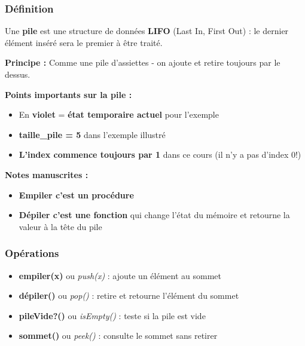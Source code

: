 \documentclass[12pt,a4paper]{article}
\begin{document}
\subsubsection{Définition}

\begin{definition}
Une \textbf{pile} est une structure de données \textcolor{importantrouge}{\textbf{LIFO}} (Last In, First Out) : le dernier élément inséré sera le premier à être traité.

\textbf{Principe :} Comme une pile d'assiettes - on ajoute et retire toujours par le dessus.
\end{definition}

\begin{notecours}
\textbf{Points importants sur la pile :}
\begin{itemize}
    \item En \textbf{violet} = \textbf{état temporaire actuel} pour l'exemple
    \item \textbf{taille\_pile = 5} dans l'exemple illustré
    \item \textbf{L'index commence toujours par 1} dans ce cours (il n'y a pas d'index 0!)
\end{itemize}

\textbf{Notes manuscrites :}
\begin{itemize}
    \item \textbf{Empiler c'est un procédure}
    \item \textbf{Dépiler c'est une fonction} qui change l'état du mémoire et retourne la valeur à la tête du pile
\end{itemize}
\end{notecours}

\subsubsection{Opérations}

\begin{important}
\begin{itemize}
    \item \textbf{empiler(x)} ou \textit{push(x)} : ajoute un élément au sommet
    \item \textbf{dépiler()} ou \textit{pop()} : retire et retourne l'élément du sommet
    \item \textbf{pileVide?()} ou \textit{isEmpty()} : teste si la pile est vide
    \item \textbf{sommet()} ou \textit{peek()} : consulte le sommet sans retirer
\end{itemize}
\end{important}
\end{document}
